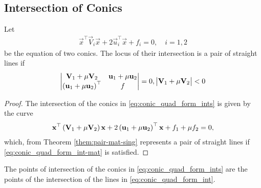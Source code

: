 \documentclass[journal,12pt,onecolumn]{IEEEtran}
\begin{document}
\subsection{Intersection of Conics}
\begin{lemma}
	Let 
\begin{align}
    \label{eq:conic_quad_form_ints}
    \vec{x}^{\top}\vec{V}_i\vec{x}+2\vec{u}_i^{\top}\vec{x}+f_i=0, \quad i = 1,2
    \end{align}
    be the equation of two conics.  The locus of their intersection is a pair of straight lines if 
\begin{align}
\begin{vmatrix}
\mathbf{V}_1+ \mu \mathbf{V}_2&\mathbf{u}_1+\mu\mathbf{u}_2
\\
	\left(\mathbf{u}_1+\mu\mathbf{u}_2\right)^{\top}&f
\end{vmatrix}
	= 0, \begin{vmatrix}\mathbf{V}_1+ \mu \mathbf{V}_2\end{vmatrix} < 0
    \label{eq:conic_quad_form_int-mat}
\end{align}

\end{lemma}
\begin{proof}
	The intersection of the conics in 
    \eqref{eq:conic_quad_form_ints}
    is given by the curve 
\begin{align}
    \label{eq:conic_quad_form_int}
	\mathbf{x}^{\top}\left(\mathbf{V}_1+ \mu \mathbf{V}_2\right)\mathbf{x}+2\left(\mathbf{u}_1+\mu \mathbf{u}_2\right)^{\top}\mathbf{x}
	+f_1+\mu f_2=0, 
    \end{align}
which, from Theorem 
	  \ref{them:pair-mat-sing}
represents a pair of straight lines if 
    \eqref{eq:conic_quad_form_int-mat} is satisfied.
\end{proof}
\begin{corollary}
	The points of intersection of the conics in 
    \eqref{eq:conic_quad_form_ints} are the points of the intersection of the lines in 
    \eqref{eq:conic_quad_form_int}.
\end{corollary}
\end{document}
